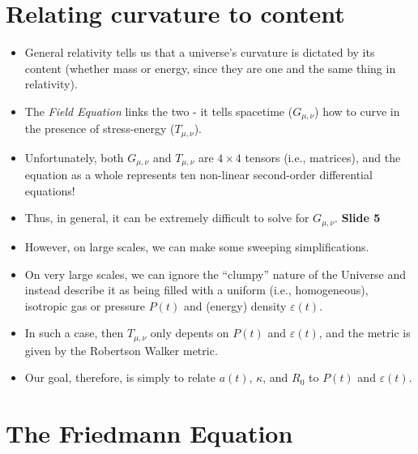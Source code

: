 \documentclass[11pt]{article}
\begin{document}
\section{Relating curvature to content}
\begin{itemize}
\item General relativity tells us that a universe's curvature is dictated by its content (whether mass or energy, since they are one and the same thing in relativity).
\item The {\it Field Equation} links the two - it tells spacetime ($G_{\mu,\nu}$) how to curve in the presence of stress-energy ($T_{\mu, \nu}$).
\item Unfortunately, both $G_{\mu,\nu}$ and $T_{\mu, \nu}$ are $4\times4$ tensors (i.e., matrices), and the equation as a whole represents ten non-linear second-order differential equations!
\item Thus, in general, it can be extremely difficult to solve for $G_{\mu,\nu}$.
{\bf Slide 5}
\item However, on large scales, we can make some sweeping simplifications.
\item On very large scales, we can ignore the ``clumpy'' nature of the Universe and instead describe it as being filled with a uniform (i.e., homogeneous), isotropic gas or pressure $P(t)$ and (energy) density $\varepsilon(t)$.
\item In such a case, then $T_{\mu,\nu}$ only depents on $P(t)$ and $\varepsilon(t)$, and the metric is given by the Robertson Walker metric.
\item Our goal, therefore, is simply to relate $a(t)$, $\kappa$, and $R_0$ to $P(t)$ and $\varepsilon(t)$.
\end{itemize}

\section{The Friedmann Equation}
\end{document}
